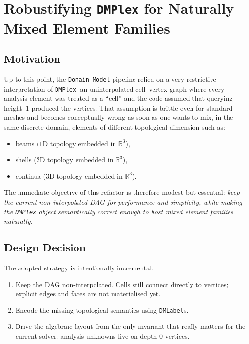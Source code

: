 \chapter{Robustifying \texttt{DMPlex} for Naturally Mixed Element Families}
\label{ch:dmplex-mixed-topology}

\section{Motivation}

Up to this point, the \texttt{Domain}--\texttt{Model} pipeline relied on a
very restrictive interpretation of \texttt{DMPlex}: an uninterpolated
cell--vertex graph where every analysis element was treated as a ``cell'' and
the code assumed that querying height~$1$ produced the vertices. That
assumption is brittle even for standard meshes and becomes conceptually wrong
as soon as one wants to mix, in the same discrete domain, elements of
different topological dimension such as:
\begin{itemize}
  \item beams ($1$D topology embedded in $\mathbb{R}^3$),
  \item shells ($2$D topology embedded in $\mathbb{R}^3$),
  \item continua ($3$D topology embedded in $\mathbb{R}^3$).
\end{itemize}

The immediate objective of this refactor is therefore modest but essential:
\emph{keep the current non-interpolated DAG for performance and simplicity,
while making the \texttt{DMPlex} object semantically correct enough to host
mixed element families naturally.}

\section{Design Decision}

The adopted strategy is intentionally incremental:
\begin{enumerate}
  \item Keep the DAG non-interpolated. Cells still connect directly to
        vertices; explicit edges and faces are not materialised yet.
  \item Encode the missing topological semantics using \texttt{DMLabel}s.
  \item Drive the algebraic layout from the only invariant that really matters
        for the current solver: analysis unknowns live on depth-$0$ vertices.
\end{enumerate}

